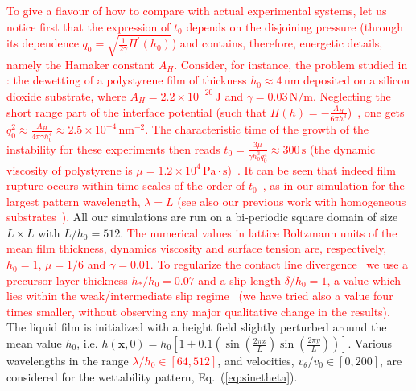 \documentclass[twocolumn,amsmath,amssymb,showpacs,prl,superscriptaddress]{revtex4-1} %
\begin{document}
\textcolor{red}{To give a flavour of how to compare with actual experimental systems, let us notice
first that the expression of $t_0$ depends on the disjoining pressure (through its dependence 
 $q_0 = \sqrt{\frac{1}{2\gamma} \Pi^{\prime}(h_0)}$) and contains, therefore, energetic details, namely 
 the Hamaker constant $A_H$. Consider, for instance, the problem studied in \cite{becker2003complex}: the dewetting of a polystyrene film of thickness $h_0 \approx 4 \, \text{nm}$ deposited on a silicon 
dioxide substrate, where $A_H  = 2.2 \times 10^{-20} \, \text{J}$ and 
$\gamma = 0.03 \, \text{N}/\text{m}$. Neglecting the short range part of the interface potential
(such that $\Pi(h)= - \frac{A_H}{6\pi h^3}$)~\cite{Mecke_2005,becker2003complex}, one gets 
$q_0^2 \approx \frac{A_H}{4\pi \gamma h_0^4} \approx 2.5 \times 10^{-4} \, \text{nm}^{-2}$.
The characteristic time of the growth of the instability for these experiments then reads $t_0 = \frac{3\mu}{\gamma h_0^3 q_0^4} \approx 300 \, \text{s}$ (the dynamic viscosity of polystyrene is 
$\mu = 1.2 \times 10^4 \, \text{Pa} \cdot \text{s}$)~\cite{PhysRevLett.99.114503}. It can be seen that indeed film rupture occurs within time 
scales of the order of $t_0$~\cite{becker2003complex}, as in our 
simulation for the largest pattern wavelength, $\lambda = L$ (see also our previous work
with homogeneous substrates~\cite{PhysRevE.104.034801}).}
All our simulations are run on a bi-periodic square domain of size $L \times L$ with 
$L/h_0 = 512 $. \textcolor{red}{The numerical values in lattice Boltzmann units of the 
mean film thickness, dynamics viscosity and surface tension are, respectively, $h_0=1$, $\mu=1/6$
and $\gamma=0.01$.}
\textcolor{red}{To regularize the contact line divergence~\cite{huh1971hydrodynamic} we use a precursor layer thickness $h_{\ast}/h_0=0.07$ and a slip length $\delta/h_0 = 1$, 
a value which lies
within the weak/intermediate slip regime~\cite{peschka2019signatures,fetzer2007quantifying, munch2005lubrication} (we have tried also a value four times smaller, without observing 
any major qualitative change in the results).} 
The liquid film is initialized with a height field slightly perturbed around the mean value $h_0$, i.e. $h(\mathbf{x},0) = h_0 \left[1 + 0.1 \left(\sin\left(\frac{2\pi x}{L}\right)\sin\left(\frac{2\pi y}{L}\right)\right)\right]$.
Various wavelengths in the range \textcolor{red}{$\lambda/h_0 \in [64, 512]$}, and velocities,
$v_{\theta}/v_0 \in [0, 200]$, are considered for the wettability pattern, Eq.~(\ref{eq:sinetheta}). 
\end{document}
